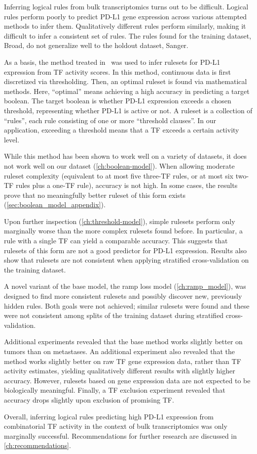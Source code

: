 Inferring logical rules from bulk transcriptomics turns out to be difficult.
Logical rules perform poorly to predict PD-L1 gene expression across various attempted methods to infer them.
Qualitatively different rules perform similarly, making it difficult to infer a consistent set of rules.
The rules found for the training dataset, Broad, do not generalize well to the holdout dataset, Sanger.

As a basis, the method treated in~\cite{lawless_interpretable_2023} was used to
infer rulesets for PD-L1 expression from TF activity scores.
In this method, continuous data is first discretized via thresholding.
Then, an optimal ruleset is found via mathematical methods.
Here, ``optimal'' means achieving a high accuracy in predicting a target boolean.
The target boolean is whether PD-L1 expression exceeds a chosen threshold, representing whether PD-L1 is active or not.
A ruleset is a collection of ``rules'', each rule consisting of one or more ``threshold clauses''.
In our application, exceeding a threshold means that a TF exceeds a certain activity level.

While this method has been shown to work well on a variety of datasets, it does not work well on our dataset
(\autoref{ch:boolean-model}).
When allowing moderate ruleset complexity (equivalent to at most five three-TF rules, or at most six two-TF rules plus a one-TF rule),
accuracy is not high.
In some cases, the results prove that no meaningfully better ruleset of this form exists (\autoref{sec:boolean_model_appendix}).

Upon further inspection (\autoref{ch:threshold-model}),
simple rulesets perform only marginally worse than the more complex rulesets found before.
In particular, a rule with a single TF can yield a comparable accuracy.
This suggests that rulesets of this form are not a good predictor for PD-L1 expression.
Results also show that rulesets are not consistent when applying stratified cross-validation on the training dataset.

\clearpage

A novel variant of the base model, the ramp loss model (\autoref{ch:ramp_model}),
was designed to find more consistent rulesets and possibly discover new, previously hidden rules.
Both goals were not achieved; similar rulesets were found and
these were not consistent among splits of the training dataset during stratified cross-validation.

Additional experiments revealed that the base method works slightly better on tumors than on metastases.
An additional experiment also revealed that the method works slightly better on raw TF gene expression data,
rather than TF activity estimates, yielding qualitatively different results with slightly higher accuracy.
However, rulesets based on gene expression data are not expected to be biologically meaningful.
Finally, a TF exclusion experiment revealed that accuracy drops slightly upon exclusion of promising TF\@.

Overall, inferring logical rules predicting high PD-L1 expression from combinatorial TF activity
in the context of bulk transcriptomics was only marginally successful.
Recommendations for further research are discussed in \autoref{ch:recommendations}.